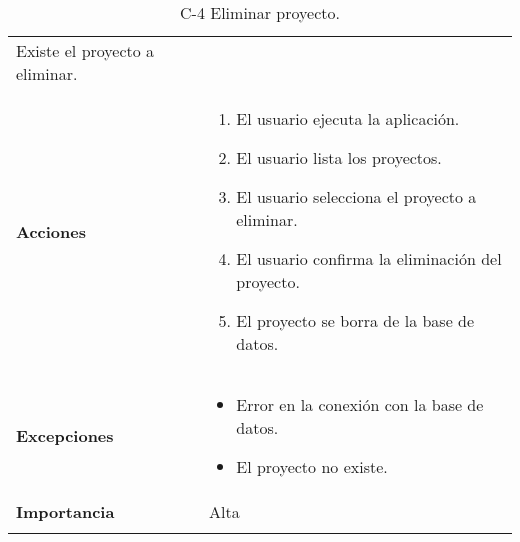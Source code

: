 \begin{longtable}[H]{@{}ll@{}}
\begin{minipage}[t]{0.71\columnwidth}
Existe el proyecto a eliminar.
\strut
\end{minipage}\tabularnewline
\begin{minipage}[t]{0.23\columnwidth}\raggedright\strut
\textbf{Acciones}\strut
\end{minipage} & \begin{minipage}[t]{0.71\columnwidth}\raggedright\strut
\begin{enumerate}
\def\labelenumi{\arabic{enumi}.}
\item
El usuario ejecuta la aplicación.
\item
El usuario lista los proyectos.
\item
El usuario selecciona el proyecto a eliminar.
\item
El usuario confirma la eliminación del proyecto.
\item
El proyecto se borra de la base de datos.
\end{enumerate}\strut
\end{minipage}\tabularnewline
\begin{minipage}[t]{0.23\columnwidth}\raggedright\strut
\textbf{Excepciones}\strut
\end{minipage} & \begin{minipage}[t]{0.71\columnwidth}\raggedright\strut
\begin{itemize}
\item
Error en la conexión con la base de datos.
\item
El proyecto no existe.
\end{itemize}\strut
\end{minipage}\tabularnewline
\begin{minipage}[t]{0.23\columnwidth}\raggedright\strut
\textbf{Importancia}\strut
\end{minipage} & \begin{minipage}[t]{0.71\columnwidth}\raggedright\strut
Alta\strut
\end{minipage}\tabularnewline
\bottomrule
\caption{C-4 Eliminar proyecto.}
\end{longtable}


